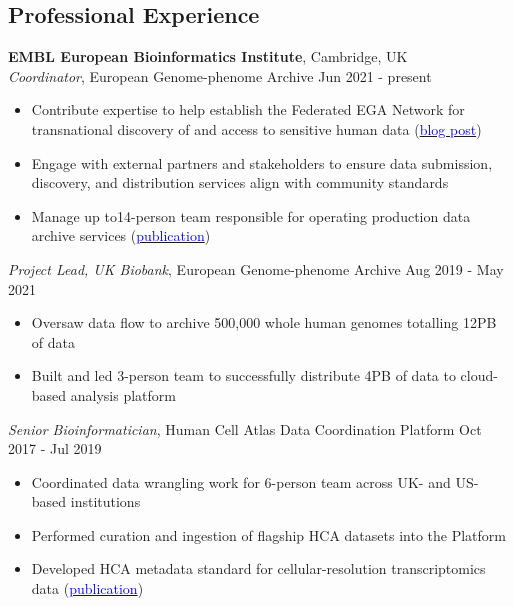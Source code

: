 \documentclass[margin,line]{res}
\begin{document}
\begin{resume}
\section{\sc Professional Experience}
{\bf EMBL European Bioinformatics Institute}, Cambridge, UK\\
{\em Coordinator}, European Genome-phenome Archive \hfill {Jun 2021 - present}
\begin{itemize}
\itemsep0em 
	\item Contribute expertise to help establish the Federated EGA Network for transnational discovery of and access to sensitive human data (\href{https://ega-archive.org/blog/safe-access-to-sensitive-human-data-across-borders-federated-ega/}{\textcolor{blue}{blog post}})
	\item Engage with external partners and stakeholders to ensure data submission, discovery, and distribution services align with community standards
	\item Manage up to14-person team responsible for operating production data archive services (\href{https://doi.org/10.1093/nar/gkab1059}{\textcolor{blue}{publication}})
\end{itemize}

{\em Project Lead, UK Biobank}, European Genome-phenome Archive \hfill {Aug 2019 - May 2021}
\begin{itemize}
\itemsep0em 
	\item Oversaw data flow to archive 500,000 whole human genomes totalling 12PB of data
	\item Built and led 3-person team to successfully distribute 4PB of data to cloud-based analysis platform
\end{itemize}

{\em Senior Bioinformatician}, Human Cell Atlas Data Coordination Platform \hfill {Oct 2017 - Jul 2019}
\begin{itemize}
\itemsep0em 
	\item Coordinated data wrangling work for 6-person team across UK- and US-based institutions
	\item Performed curation and ingestion of flagship HCA datasets into the Platform
	\item Developed HCA metadata standard for cellular-resolution transcriptomics data (\href{https://doi.org/10.1038/s41587-020-00744-z}{\textcolor{blue}{publication}})
\end{itemize}


\end{resume}
\end{document}
